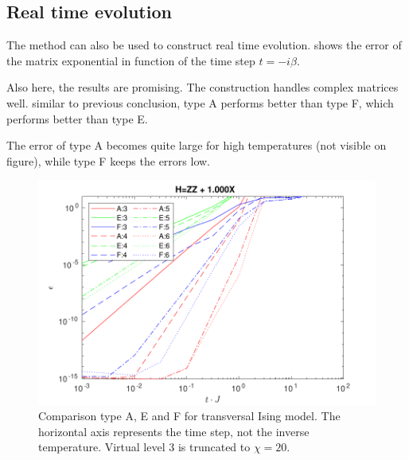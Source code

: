 





\subsection{Real time evolution} \label{subsec_rt_evo}

The method can also be used to construct real time evolution.  shows the error of the matrix exponential in function of the time step $t = -i \beta $. 

Also here, the results are promising. The construction handles complex matrices well. similar to previous conclusion, type A performs better than type F, which performs better than type E.

The error of type A becomes quite large for high temperatures (not visible on figure), while type F keeps the errors low. 

\begin{figure}
    \center
    \includegraphics[width=\textwidth]{Figuren/benchmarking/1D_t_ising_time.pdf}
    \caption{Comparison type A, E and F for transversal Ising model. The horizontal axis represents the time step, not the inverse temperature. Virtual level 3 is truncated to $\chi=20$.  }
    \label{fig:benchmark:tising_time}
\end{figure}

